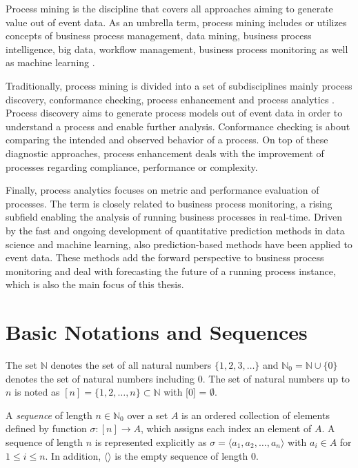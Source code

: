 Process mining is the discipline that covers all approaches aiming to generate value out of event data.
As an umbrella term, process mining includes or utilizes concepts of business process management, data mining, business process intelligence, big data, workflow management, business process monitoring \cite{DBLP:books/sp/Aalst16} as well as machine learning \cite{DBLP:conf/bpm/VeitGMHT17}.

Traditionally, process mining is divided into a set of subdisciplines mainly process discovery, conformance checking, process enhancement and process analytics \cite{DBLP:conf/caise/EckLLA15}.
Process discovery aims to generate process models out of event data in order to understand a process and enable further analysis.
Conformance checking is about comparing the intended and observed behavior of a process. 
On top of these diagnostic approaches, process enhancement deals with the improvement of processes regarding compliance, performance or complexity.

Finally, process analytics focuses on metric and performance evaluation of processes. The term is closely related to business process monitoring, a rising subfield enabling the analysis of running business processes in real-time.
Driven by the fast and ongoing development of quantitative prediction methods in data science and machine learning, also prediction-based methods have been applied to event data.
These methods add the forward perspective to business process monitoring and deal with forecasting the future of a running process instance, which is also the main focus of this thesis.


\section{Basic Notations and Sequences}

The set $\mathbb{N}$ denotes the set of all natural numbers $\{1, 2, 3, \dots\}$ and $\mathbb{N}_0 = \mathbb{N} \cup \{0\}$ denotes the set of natural numbers including 0.
The set of natural numbers up to $n$ is noted as $[n] = \{1, 2, \dots, n\} \subset \mathbb{N}$ with [0] = $\emptyset$.

\begin{definition}[Sequence]
		A \textit{sequence} of length $n \in \mathbb{N}_0$ over a set $A$ is an ordered collection of elements defined by function $\sigma \colon [n]\to A$, which assigns each index an element of $A$.
		A sequence  of length $n$ is represented explicitly as $\sigma = \langle a_1, a_2, \dots, a_n\rangle $ with $a_i \in A$ for $1 \leq i \leq n$. In addition, $\langle \rangle$ is the empty sequence of length $0$.
\end{definition}

